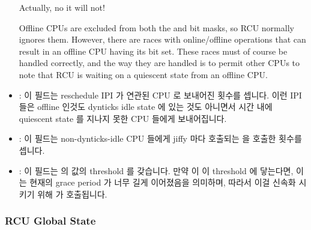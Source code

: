 \begin{itemize}
{	Actually, no it will not!

	Offline CPUs are excluded from both the  and
	 bit masks, so RCU normally ignores them.
	However, there are races with online/offline operations that
	can result in an offline CPU having its  bit set.
	These races must of course be handled correctly, and the way
	they are handled is to permit other CPUs to note that RCU
	is waiting on a quiescent state from an offline CPU.
	\fi
} \QuickQuizEnd

\item	{}:
	이 필드는 reschedule IPI 가 연관된 CPU 로 보내어진 횟수를 셉니다.
	이런 IPI 들은 offline 인것도 dynticks idle state 에 있는 것도 아니면서
	시간 내에 quiescent state 를 지나지 못한 CPU 들에게 보내어집니다.
\item	{}:
	이 필드는 non-dynticks-idle CPU 들에게 jiffy 마다 호출되는
	 을 호출한 횟수를 셉니다.
\item	{}:
	이 필드는  의 값의 threshold 를 갖습니다.
	만약  이 이 threshold 에 닿는다면, 이는 현재의 grace
	period 가 너무 길게 이어졌음을 의미하며, 따라서 이걸 신속화 시키기 위해
	 가 호출됩니다.
\iffalse

\item	\co{resched_ipi}:
	This field counts the number of times that a reschedule IPI
	is sent to the corresponding CPU.
	Such IPIs are sent to CPUs that fail to report passing through
	a quiescent states in a timely manner, but are neither offline
	nor in dynticks idle state.
\item	\co{n_rcu_pending}:
	This field counts the number of calls to \co{rcu_pending()},
	which is called once per jiffy on non-dynticks-idle CPUs.
\item	\co{n_rcu_pending_force_qs}:
	This field holds a threshold value for \co{n_rcu_pending}.
	If \co{n_rcu_pending} reaches this threshold, that indicates
	that the current grace period has extended too long, so
	\co{force_quiescent_state()} is invoked to expedite it.
\fi
\end{itemize}

\subsubsection{RCU Global State}
\label{app:rcuimpl:rcutreewt:RCU Global State}

